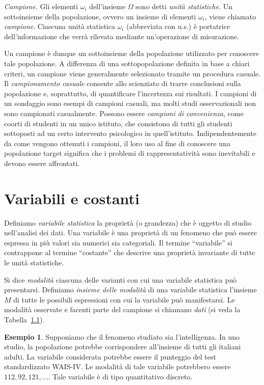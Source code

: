 \documentclass[
  11pt,
]{krantz}
\theoremstyle{definition}
\theoremstyle{definition}
\newtheorem{example}{Esempio}[chapter]
\theoremstyle{definition}
\theoremstyle{definition}
\theoremstyle{remark}
\begin{document}
\emph{Campione.} Gli elementi \(\omega_i\) dell'insieme \(\Omega\) sono detti \emph{unità statistiche}. Un sottoinsieme della popolazione, ovvero un insieme di elementi \(\omega_i\), viene chiamato \emph{campione}. Ciascuna unità statistica \(\omega_i\) (abbreviata con u.s.) è portatrice dell'informazione che verrà rilevata mediante un'operazione di misurazione.

Un campione è dunque un sottoinsieme della popolazione utilizzato per conoscere tale popolazione. A differenza di una sottopopolazione definita in base a chiari criteri, un campione viene generalmente selezionato tramite un procedura casuale. Il \emph{campionamento casuale} consente allo scienziato di trarre conclusioni sulla popolazione e, soprattutto, di quantificare l'incertezza sui risultati. I campioni di un sondaggio sono esempi di campioni casuali, ma molti studi osservazionali non sono campionati casualmente. Possono essere \emph{campioni di convenienza}, come coorti di studenti in un unico istituto, che consistono di tutti gli studenti sottoposti ad un certo intervento psicologico in quell'istituto. Indipendentemente da come vengono ottenuti i campioni, il loro uso al fine di conoscere una popolazione target significa che i problemi di rappresentatività sono inevitabili e devono essere affrontati.

\hypertarget{variabili-e-costanti}{%
\section{Variabili e costanti}\label{variabili-e-costanti}}

Definiamo \emph{variabile statistica} la proprietà (o grandezza) che è oggetto di studio nell'analisi dei dati. Una variabile è una proprietà di un fenomeno che può essere espressa in più valori sia numerici sia categoriali. Il termine ``variabile'' si contrappone al termine ``costante'' che descrive una proprietà invariante di tutte le unità statistiche.

Si dice \emph{modalità} ciascuna delle varianti con cui una variabile statistica può presentarsi. Definiamo \emph{insieme delle modalità} di una variabile statistica l'insieme \(M\) di tutte le possibili espressioni con cui la variabile può manifestarsi. Le modalità osservate e facenti parte del campione si chiamano \emph{dati} (si veda la Tabella~\protect\hyperlink{tab:term_st_desc}{1.1}).

\begin{example}
Supponiamo che il fenomeno studiato sia l'intelligenza. In uno studio, la popolazione potrebbe corrispondere all'insieme di tutti gli italiani adulti. La variabile considerata potrebbe essere il punteggio del test standardizzato WAIS-IV. Le modalità di tale variabile potrebbero essere \(112, 92, 121, \dots\). Tale variabile è di tipo quantitativo discreto.
\end{example}
\end{document}

